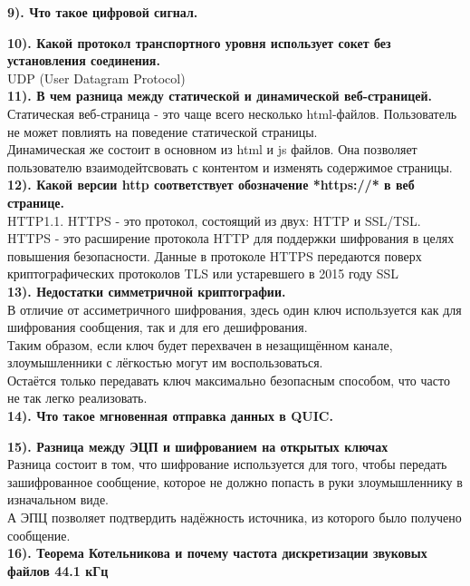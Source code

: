 \documentclass[11pt,a4paper]{article}
\begin{document}
\textbf{9). Что такое цифровой сигнал.
}

\textbf{10). Какой протокол транспортного уровня использует сокет без установления соединения.
}
\\
UDP (User Datagram Protocol)
\\
\textbf{11). В чем разница между статической и динамической веб-страницей.
}
\\
Статическая веб-страница - это чаще всего несколько html-файлов. Пользователь не может повлиять на поведение статической страницы.
\\
Динамическая же состоит в основном из html и js файлов. Она позволяет пользователю взаимодейтсвовать с контентом и изменять содержимое страницы.
\\
\textbf{12). Какой версии http соответствует обозначение *https://* в веб странице.
}
\\
HTTP1.1. HTTPS - это протокол, состоящий из двух: HTTP и SSL/TSL.
\\
HTTPS - это расширение протокола HTTP для поддержки шифрования в целях повышения безопасности. Данные в протоколе HTTPS передаются поверх криптографических протоколов TLS или устаревшего в 2015 году SSL
\\
\textbf{13). Недостатки симметричной криптографии.}
\\
В отличие от ассиметричного шифрования, здесь один ключ используется как для шифрования сообщения, так и для его дешифрования.
\\
Таким образом, если ключ будет перехвачен в незащищённом канале, злоумышленники с лёгкостью могут им воспользоваться.
\\
Остаётся только передавать ключ максимально безопасным способом, что часто не так легко реализовать.
\\
\textbf{14). Что такое мгновенная отправка данных в QUIC.
}

\textbf{15). Разница между ЭЦП и шифрованием на открытых ключах
}
\\
Разница состоит в том, что шифрование используется для того, чтобы передать зашифрованное сообщение, которое не должно попасть в руки злоумышленнику в изначальном виде.
\\
А ЭПЦ позволяет подтвердить надёжность источника, из которого было получено сообщение.
\\
\textbf{16). Теорема Котельникова и почему частота дискретизации звуковых файлов 44.1 кГц
}
\end{document}
